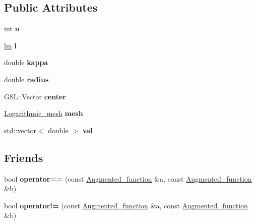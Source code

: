 \subsection*{Public Attributes}
\begin{DoxyCompactItemize}
\item 
\mbox{\label{classAugmented__function_a8451882862bc85f60a9160c2bfc5e677}} 
int {\bfseries n}
\item 
\mbox{\label{classAugmented__function_a85851e9826059061b94dea2dfeae7b09}} 
\hyperlink{structlm}{lm} {\bfseries l}
\item 
\mbox{\label{classAugmented__function_acbbd8bf7d17a9557a74f531986f9301b}} 
double {\bfseries kappa}
\item 
\mbox{\label{classAugmented__function_af96cf7923c9d5d656235e3d2c739c99f}} 
double {\bfseries radius}
\item 
\mbox{\label{classAugmented__function_abfe2b7d790f5717ba5f403b6779ff627}} 
G\+S\+L\+::\+Vector {\bfseries center}
\item 
\mbox{\label{classAugmented__function_ad7acfd1cf1c5c5cbca70267348fc10f6}} 
\hyperlink{classLogarithmic__mesh}{Logarithmic\+\_\+mesh} {\bfseries mesh}
\item 
\mbox{\label{classAugmented__function_af11b31e3d3a6e798b6982a135684d4ea}} 
std\+::vector$<$ double $>$ {\bfseries val}
\end{DoxyCompactItemize}
\subsection*{Friends}
\begin{DoxyCompactItemize}
\item 
\mbox{\label{classAugmented__function_a2ce33222aea67403b16a734072c8a1e0}} 
bool {\bfseries operator==} (const \hyperlink{classAugmented__function}{Augmented\+\_\+function} \&a, const \hyperlink{classAugmented__function}{Augmented\+\_\+function} \&b)
\item 
\mbox{\label{classAugmented__function_a7e26f4f6e76afdedf16a6b579fb5913e}} 
bool {\bfseries operator!=} (const \hyperlink{classAugmented__function}{Augmented\+\_\+function} \&a, const \hyperlink{classAugmented__function}{Augmented\+\_\+function} \&b)
\end{DoxyCompactItemize}


